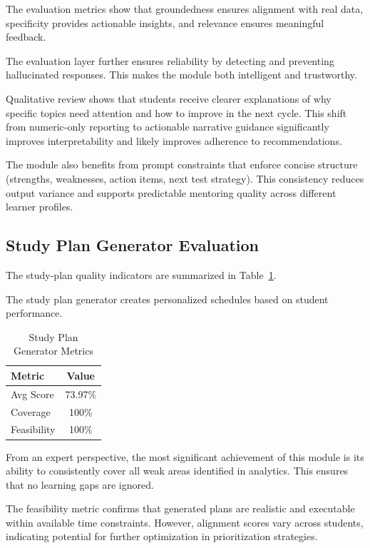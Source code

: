 \begin{sloppypar}
The evaluation metrics show that groundedness ensures alignment with real data, specificity provides actionable insights, and relevance ensures meaningful feedback.

The evaluation layer further ensures reliability by detecting and preventing hallucinated responses. This makes the module both intelligent and trustworthy.

Qualitative review shows that students receive clearer explanations of why specific topics need attention and how to improve in the next cycle. This shift from numeric-only reporting to actionable narrative guidance significantly improves interpretability and likely improves adherence to recommendations.

The module also benefits from prompt constraints that enforce concise structure (strengths, weaknesses, action items, next test strategy). This consistency reduces output variance and supports predictable mentoring quality across different learner profiles.

\subsection{Study Plan Generator Evaluation}

The study-plan quality indicators are summarized in Table~\ref{tab:study_plan_metrics}.

The study plan generator creates personalized schedules based on student performance.

\begin{table}[H]
\centering
\caption{Study Plan Generator Metrics}
\label{tab:study_plan_metrics}
\begin{tabular}{|l|c|}
\hline
Metric & Value \\
\hline
Avg Score & 73.97\% \\
\hline
Coverage & 100\% \\
\hline
Feasibility & 100\% \\
\hline
\end{tabular}
\end{table}

From an expert perspective, the most significant achievement of this module is its ability to consistently cover all weak areas identified in analytics. This ensures that no learning gaps are ignored.

The feasibility metric confirms that generated plans are realistic and executable within available time constraints. However, alignment scores vary across students, indicating potential for further optimization in prioritization strategies.


\end{sloppypar}
